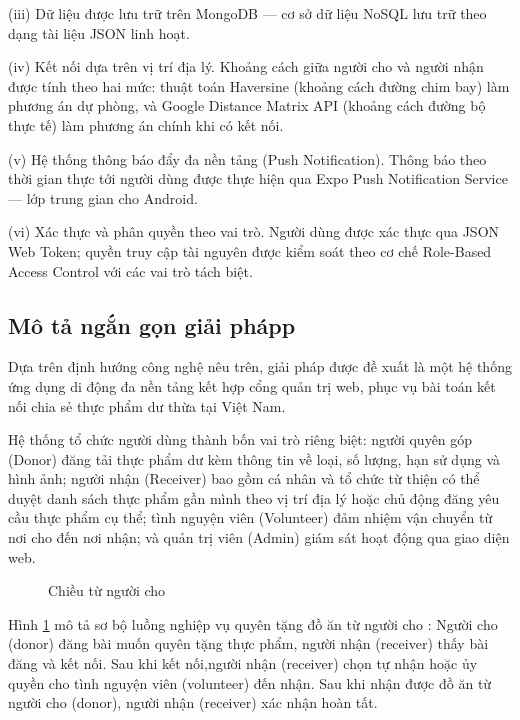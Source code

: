 \documentclass[../main.tex]{subfiles}%
\begin{document}
(iii) Dữ liệu được lưu trữ trên MongoDB — cơ sở dữ liệu NoSQL lưu trữ theo dạng tài liệu JSON linh hoạt.

(iv) Kết nối dựa trên vị trí địa lý. Khoảng cách giữa người cho và người nhận được tính theo hai mức: thuật toán Haversine (khoảng cách đường chim bay) làm phương án dự phòng, và Google Distance Matrix API (khoảng cách đường bộ thực tế) làm phương án chính khi có kết nối. 

(v) Hệ thống thông báo đẩy đa nền tảng (Push Notification). Thông báo theo thời gian thực tới người dùng được thực hiện qua Expo Push Notification Service — lớp trung gian cho Android. 

(vi) Xác thực và phân quyền theo vai trò. Người dùng được xác thực qua JSON Web Token; quyền truy cập tài nguyên được kiểm soát theo cơ chế Role-Based Access Control với các vai trò tách biệt. 

\subsection{Mô tả ngắn gọn giải phápp}
\label{subsection:1.3.2}

Dựa trên định hướng công nghệ nêu trên, giải pháp được đề xuất là một hệ thống ứng dụng di động đa nền tảng kết hợp cổng quản trị web, phục vụ bài toán kết nối chia sẻ thực phẩm dư thừa tại Việt Nam.

Hệ thống tổ chức người dùng thành bốn vai trò riêng biệt: người quyên góp (Donor) đăng tải thực phẩm dư kèm thông tin về loại, số lượng, hạn sử dụng và hình ảnh; người nhận (Receiver) bao gồm cá nhân và tổ chức từ thiện có thể duyệt danh sách thực phẩm gần mình theo vị trí địa lý hoặc chủ động đăng yêu cầu thực phẩm cụ thể; tình nguyện viên (Volunteer) đảm nhiệm vận chuyển từ nơi cho đến nơi nhận; và quản trị viên (Admin) giám sát hoạt động qua giao diện web.

\begin{figure}[h]
    \centering
    \caption{Chiều từ người cho}
    \label{fig:luong_tu_nguoi_cho}
\end{figure}

Hình \ref{fig:luong_tu_nguoi_cho} mô tả sơ bộ luồng nghiệp vụ quyên tặng đồ ăn từ người cho : Người cho (donor) đăng bài muốn quyên tặng thực phẩm, người nhận (receiver) thấy bài đăng và kết nối. Sau khi kết nối,người nhận (receiver) chọn tự nhận hoặc ủy quyền cho tình nguyện viên (volunteer) đến nhận. Sau khi nhận được đồ ăn từ người cho (donor), người nhận (receiver) xác nhận hoàn tất.
\end{document}
